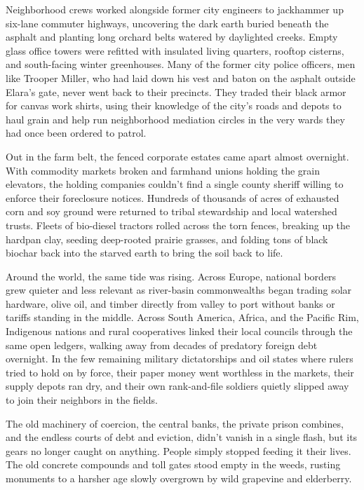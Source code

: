 Neighborhood crews worked alongside former city engineers to jackhammer up six-lane commuter highways, uncovering the dark earth buried beneath the asphalt and planting long orchard belts watered by daylighted creeks. Empty glass office towers were refitted with insulated living quarters, rooftop cisterns, and south-facing winter greenhouses. Many of the former city police officers, men like Trooper Miller, who had laid down his vest and baton on the asphalt outside Elara’s gate, never went back to their precincts. They traded their black armor for canvas work shirts, using their knowledge of the city's roads and depots to haul grain and help run neighborhood mediation circles in the very wards they had once been ordered to patrol.

Out in the farm belt, the fenced corporate estates came apart almost overnight. With commodity markets broken and farmhand unions holding the grain elevators, the holding companies couldn't find a single county sheriff willing to enforce their foreclosure notices. Hundreds of thousands of acres of exhausted corn and soy ground were returned to tribal stewardship and local watershed trusts. Fleets of bio-diesel tractors rolled across the torn fences, breaking up the hardpan clay, seeding deep-rooted prairie grasses, and folding tons of black biochar back into the starved earth to bring the soil back to life.

Around the world, the same tide was rising. Across Europe, national borders grew quieter and less relevant as river-basin commonwealths began trading solar hardware, olive oil, and timber directly from valley to port without banks or tariffs standing in the middle. Across South America, Africa, and the Pacific Rim, Indigenous nations and rural cooperatives linked their local councils through the same open ledgers, walking away from decades of predatory foreign debt overnight. In the few remaining military dictatorships and oil states where rulers tried to hold on by force, their paper money went worthless in the markets, their supply depots ran dry, and their own rank-and-file soldiers quietly slipped away to join their neighbors in the fields.

The old machinery of coercion, the central banks, the private prison combines, and the endless courts of debt and eviction, didn't vanish in a single flash, but its gears no longer caught on anything. People simply stopped feeding it their lives. The old concrete compounds and toll gates stood empty in the weeds, rusting monuments to a harsher age slowly overgrown by wild grapevine and elderberry.

